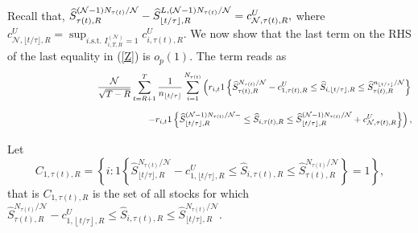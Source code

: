 Recall that, $\widehat{S}_{\tau(t),R}^{(\mathcal{N}%
-1)N_{\tau(t)}/\mathcal{N}}-\widehat{S}_{\lfloor t/\tau
\rfloor ,R}^{L,(\mathcal{N}-1)N_{\tau(t)}/\mathcal{N}}=c_{%
\mathcal{N},\tau(t),R}^{U},$ where $c_{\mathcal{N},\lfloor
t/\tau \rfloor ,R}^{U}=\sup_{i\text{.s.t. }I_{i,T,R}^{(\mathcal{N}%
)}=1}c_{i,\tau(t),R}^{U}.$ We now show that the last term on
the RHS of the last equality in (\ref{Z}) is $o_{p}(1).$ The term reads as%
\begin{eqnarray}
&&\frac{\mathcal{N}}{\sqrt{T-R}}\sum_{t=R+1}^{T}\frac{1}{n_{\lfloor t/\tau
\rfloor }}\sum_{i=1}^{N_{\tau(t)}}\left( r_{i,t}1\left\{ 
\widehat{S}_{\tau(t),R}^{N_{\tau(t)}/%
\mathcal{N}}-c_{1,\tau(t),R}^{U}\leq \widehat{S}_{i,\lfloor
t/\tau \rfloor ,R}\leq \widehat{S}_{\tau(t),R}^{n_{\lfloor
t/\tau \rfloor }/\mathcal{N}}\right\} \right.   \notag \\
&&\phantom{+\frac{\mathcal{N}}{\sqrt{T-R}}\sum_{t=R+1}^{T}\frac{1}{n_{%
\tau(t)}}\sum_{i=1}^{n_{\lfloor t/\tau \rfloor
}}r_{i,t}\left( \right.}\left. -r_{i,t}1\left\{ \widehat{S}_{\lfloor t/\tau
\rfloor ,R}^{(\mathcal{N}-1)N_{\tau(t)}/\mathcal{N}-}\leq 
\widehat{S}_{i,\tau(t),R}\leq \widehat{S}_{\lfloor t/\tau
\rfloor ,R}^{(\mathcal{N}-1)N_{\tau(t)}/\mathcal{N}}+c_{%
\mathcal{N},\tau(t),R}^{U}\right\} \right) ,  \label{BTNR}
\end{eqnarray}%
Let%
\begin{equation*}
C_{1,\tau(t),R}=\left\{ i:1\left\{ \widehat{S}_{\lfloor
t/\tau \rfloor ,R}^{N_{\tau(t)}/\mathcal{N}}-c_{1,\lfloor
t/\tau \rfloor ,R}^{U}\leq \widehat{S}_{i,\tau(t),R}\leq 
\widehat{S}_{\tau(t),R}^{N_{\tau(t)}/%
\mathcal{N}}\right\} =1\right\} ,
\end{equation*}%
that is $C_{1,\tau(t),R}$ is the set of all stocks for which 
$\widehat{S}_{\tau(t),R}^{N_{\tau(t)}/%
\mathcal{N}}-c_{1,\left\lfloor t/\tau \right\rfloor ,R}^{U}\leq \widehat{S}%
_{i,\tau(t),R}\leq \widehat{S}_{\lfloor t/\tau \rfloor
,R}^{N_{\tau(t)}/\mathcal{N}}.$


